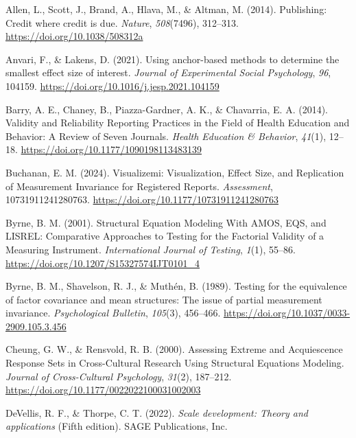 \documentclass[
  man]{apa7}
\newlength{\cslhangindent}
\newenvironment{CSLReferences}[2] %
 {\begin{list}{}{%
  \setlength{\itemindent}{0pt}
  \setlength{\leftmargin}{0pt}
  \setlength{\parsep}{0pt}
  \ifodd #1
   \setlength{\leftmargin}{\cslhangindent}
   \setlength{\itemindent}{-1\cslhangindent}
  \fi
  \setlength{\itemsep}{#2\baselineskip}}}
 {\end{list}}
\begin{document}
\label{refs}
\begin{CSLReferences}{1}{0}
Allen, L., Scott, J., Brand, A., Hlava, M., \& Altman, M. (2014). Publishing: Credit where credit is due. \emph{Nature}, \emph{508}(7496), 312--313. \url{https://doi.org/10.1038/508312a}

Anvari, F., \& Lakens, D. (2021). Using anchor-based methods to determine the smallest effect size of interest. \emph{Journal of Experimental Social Psychology}, \emph{96}, 104159. \url{https://doi.org/10.1016/j.jesp.2021.104159}

Barry, A. E., Chaney, B., Piazza-Gardner, A. K., \& Chavarria, E. A. (2014). Validity and Reliability Reporting Practices in the Field of Health Education and Behavior: A Review of Seven Journals. \emph{Health Education \& Behavior}, \emph{41}(1), 12--18. \url{https://doi.org/10.1177/1090198113483139}

Buchanan, E. M. (2024). Visualizemi: Visualization, Effect Size, and Replication of Measurement Invariance for Registered Reports. \emph{Assessment}, 10731911241280763. \url{https://doi.org/10.1177/10731911241280763}

Byrne, B. M. (2001). Structural Equation Modeling With AMOS, EQS, and LISREL: Comparative Approaches to Testing for the Factorial Validity of a Measuring Instrument. \emph{International Journal of Testing}, \emph{1}(1), 55--86. \url{https://doi.org/10.1207/S15327574IJT0101_4}

Byrne, B. M., Shavelson, R. J., \& Muthén, B. (1989). Testing for the equivalence of factor covariance and mean structures: The issue of partial measurement invariance. \emph{Psychological Bulletin}, \emph{105}(3), 456--466. \url{https://doi.org/10.1037/0033-2909.105.3.456}

Cheung, G. W., \& Rensvold, R. B. (2000). Assessing Extreme and Acquiescence Response Sets in Cross-Cultural Research Using Structural Equations Modeling. \emph{Journal of Cross-Cultural Psychology}, \emph{31}(2), 187--212. \url{https://doi.org/10.1177/0022022100031002003}

DeVellis, R. F., \& Thorpe, C. T. (2022). \emph{Scale development: Theory and applications} (Fifth edition). SAGE Publications, Inc.


\end{CSLReferences}
\end{document}
